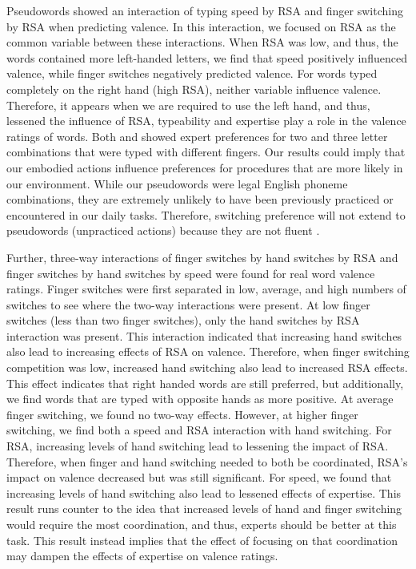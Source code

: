\documentclass[english,man,man,mask]{apa6}
\theoremstyle{definition}
\theoremstyle{definition}
\theoremstyle{definition}
\theoremstyle{remark}
\begin{document}
Pseudowords showed an interaction of typing speed by RSA and finger
switching by RSA when predicting valence. In this interaction, we
focused on RSA as the common variable between these interactions. When
RSA was low, and thus, the words contained more left-handed letters, we
find that speed positively influenced valence, while finger switches
negatively predicted valence. For words typed completely on the right
hand (high RSA), neither variable influence valence. Therefore, it
appears when we are required to use the left hand, and thus, lessened
the influence of RSA, typeability and expertise play a role in the
valence ratings of words. Both \textcite{Beilock2007} and
\textcite{VandenBergh1990} showed expert preferences for two and three
letter combinations that were typed with different fingers. Our results
could imply that our embodied actions influence preferences for
procedures that are more likely in our environment. While our
pseudowords were legal English phoneme combinations, they are extremely
unlikely to have been previously practiced or encountered in our daily
tasks. Therefore, switching preference will not extend to pseudowords
(unpracticed actions) because they are not fluent
\autocite{Oppenheimer2008}.

Further, three-way interactions of finger switches by hand switches by
RSA and finger switches by hand switches by speed were found for real
word valence ratings. Finger switches were first separated in low,
average, and high numbers of switches to see where the two-way
interactions were present. At low finger switches (less than two finger
switches), only the hand switches by RSA interaction was present. This
interaction indicated that increasing hand switches also lead to
increasing effects of RSA on valence. Therefore, when finger switching
competition was low, increased hand switching also lead to increased RSA
effects. This effect indicates that right handed words are still
preferred, but additionally, we find words that are typed with opposite
hands as more positive. At average finger switching, we found no two-way
effects. However, at higher finger switching, we find both a speed and
RSA interaction with hand switching. For RSA, increasing levels of hand
switching lead to lessening the impact of RSA. Therefore, when finger
and hand switching needed to both be coordinated, RSA's impact on
valence decreased but was still significant. For speed, we found that
increasing levels of hand switching also lead to lessened effects of
expertise. This result runs counter to the idea that increased levels of
hand and finger switching would require the most coordination, and thus,
experts should be better at this task. This result instead implies that
the effect of focusing on that coordination may dampen the effects of
expertise on valence ratings.
\end{document}
